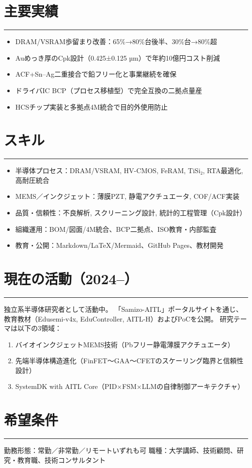 \documentclass[11pt]{bxjsarticle}
\newcommand{\cvsection}[1]{\section*{#1}\vspace{-0.3em}\hrule\vspace{0.5em}}
\begin{document}
\cvsection{主要実績}
\begin{itemize}
  \item DRAM/VSRAM歩留まり改善：65\%→80\%台後半、30\%台→80\%超
  \item Auめっき厚のCpk設計（0.425±0.125 µm）で年約10億円コスト削減
  \item ACF+Sn–Ag二重接合で鉛フリー化と事業継続を確保
  \item ドライバIC BCP（プロセス移植型）で完全互換の二拠点量産
  \item HCSチップ実装と多拠点4M統合で目的外使用防止
\end{itemize}

\cvsection{スキル}
\begin{itemize}
  \item 半導体プロセス：DRAM/VSRAM, HV-CMOS, FeRAM, TiSi₂, RTA最適化, 高耐圧統合
  \item MEMS／インクジェット：薄膜PZT, 静電アクチュエータ, COF/ACF実装
  \item 品質・信頼性：不良解析, スクリーニング設計, 統計的工程管理（Cpk設計）
  \item 組織運用：BOM/図面/4M統合、BCP二拠点、ISO教育・内部監査
  \item 教育・公開：Markdown/LaTeX/Mermaid、GitHub Pages、教材開発
\end{itemize}

\cvsection{現在の活動（2024–）}
独立系半導体研究者として活動中。  
「Samizo-AITL」ポータルサイトを通じ、教育教材（Edusemi-v4x, EduController, AITL-H）およびPoCを公開。  
研究テーマは以下の3領域：
\begin{enumerate}
  \item バイオインクジェットMEMS技術（Pbフリー静電薄膜アクチュエータ）
  \item 先端半導体構造進化（FinFET～GAA～CFETのスケーリング臨界と信頼性設計）
  \item SystemDK with AITL Core（PID×FSM×LLMの自律制御アーキテクチャ）
\end{enumerate}

\cvsection{希望条件}
勤務形態：常勤／非常勤／リモートいずれも可  
職種：大学講師、技術顧問、研究・教育職、技術コンサルタント
\end{document}
